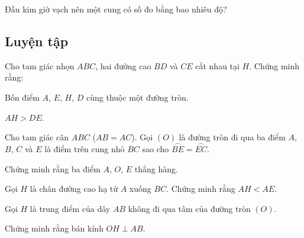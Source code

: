 \begin{exercises}
\begin{questions}[resume=SGK]
\begin{questions}
            \answerline
            \item Đầu kim giờ vạch nên một cung có số đo bằng bao nhiêu độ?

            \answerline
        \end{questions}

    \end{questions}
\end{exercises}

\begin{practice}
    \subsection{Luyện tập}

    \begin{questions}[resume=SBT]
        \item Cho tam giác nhọn $ABC$, hai đường cao $BD$ và $CE$ cắt nhau tại $H$. Chứng minh rằng:
        \begin{questions}
            \item Bốn điểm $A$, $E$, $H$, $D$ cùng thuộc một đường tròn.

            \answerline
            \answerline
            \item $AH>DE$.

            \answerline
            \answerline
        \end{questions}

        \item Cho tam giác cân $ABC$ ($AB=AC$). Gọi $(O)$ là đường tròn đi qua ba điểm $A$, $B$, $C$ và $E$ là điểm trên cung nhỏ $BC$ sao cho $\overset{\frown}{BE}=\overset{\frown}{EC}$.
        \begin{questions}
            \item Chứng minh rằng ba điểm $A$, $O$, $E$ thẳng hàng.

            \answerline
            \answerline
            \item Gọi $H$ là chân đường cao hạ từ $A$ xuống $BC$. Chứng minh rằng $AH<AE$.

            \answerline
            \answerline
        \end{questions}

        \item Gọi $H$ là trung điểm của dây $AB$ không đi qua tâm của đường tròn $(O)$.
        \begin{questions}
            \item Chứng minh rằng bán kính $OH\perp AB$.


\end{questions}
\end{questions}
\end{practice}
